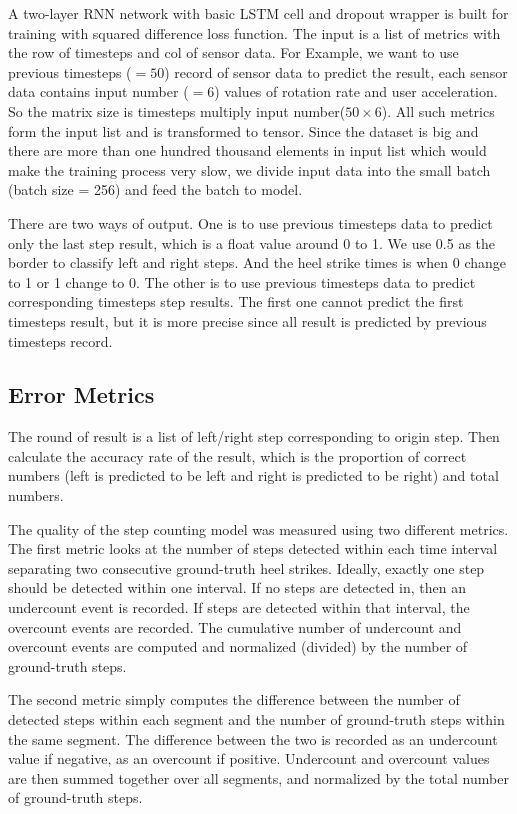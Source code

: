\documentclass[11pt]{article}
\begin{document}
A two-layer RNN network with basic LSTM cell and dropout wrapper is built for training with squared difference loss function. The input is a list of metrics with the row of timesteps and col of sensor data. For Example, we want to use previous timesteps ($=50$) record of sensor data to predict the result, each sensor data contains input number ($=6$) values of rotation rate and user acceleration. So the matrix size is timesteps multiply input number($50 \times 6$). All such metrics form the input list and is transformed to tensor. Since the dataset is big and there are more than one hundred thousand elements in input list which would make the training process very slow, we divide input data into the small batch (batch size = 256) and feed the batch to model.

There are two ways of output. One is to use previous timesteps data to predict only the last step result, which is a float value around 0 to 1. We use 0.5 as the border to classify left and right steps. And the heel strike times is when 0 change to 1 or 1 change to 0. The other is to use previous timesteps data to predict corresponding timesteps step results. The first one cannot predict the first timesteps result, but it is more precise since all result is predicted by previous timesteps record.

\subsection{Error Metrics}
The round of result is a list of left/right step corresponding to origin step. Then calculate the accuracy rate of the result, which is the proportion of correct numbers (left is predicted to be left and right is predicted to be right) and total numbers.

The quality of the step counting model was measured using two different metrics. The first metric looks at the number of steps detected within each time interval separating two consecutive ground-truth heel strikes. Ideally, exactly one step should be detected within one interval. If no steps are detected in, then an undercount event is recorded. If steps are detected within that interval, the overcount events are recorded. The cumulative number of undercount and overcount events are computed and normalized (divided) by the number of ground-truth steps.

The second metric simply computes the difference between the number of detected steps within each segment and the number of ground-truth steps within the same segment. The difference between the two is recorded as an undercount value if negative, as an overcount if positive. Undercount and overcount values are then summed together over all segments, and normalized by the total number of ground-truth steps.
\end{document}
